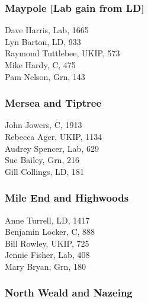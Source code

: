 \documentclass[a4paper,openany,10pt]{book}
\begin{document}
\subsubsection*{Maypole \hspace*{\fill}\nolinebreak[1]%
\enspace\hspace*{\fill}
[Lab gain from LD]}



Dave Harris, Lab, 1665\\
Lyn Barton, LD, 933\\
Raymond Tuttlebee, UKIP, 573\\
Mike Hardy, C, 475\\
Pam Nelson, Grn, 143\\


\subsubsection*{Mersea and Tiptree}



John Jowers, C, 1913\\
Rebecca Ager, UKIP, 1134\\
Audrey Spencer, Lab, 629\\
Sue Bailey, Grn, 216\\
Gill Collings, LD, 181\\


\subsubsection*{Mile End and Highwoods}



Anne Turrell, LD, 1417\\
Benjamin Locker, C, 888\\
Bill Rowley, UKIP, 725\\
Jennie Fisher, Lab, 408\\
Mary Bryan, Grn, 180\\


\subsubsection*{North Weald and Nazeing}

\end{document}
